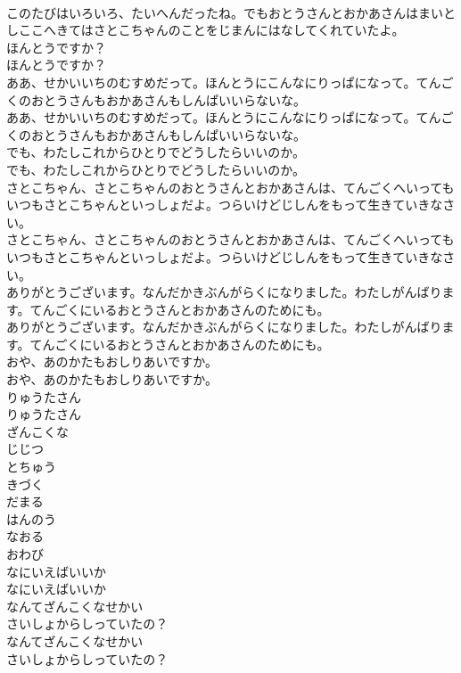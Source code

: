 \documentclass[8pt]{extreport}
\begin{document}
\begin{CJK}{UTF8}{min}
\\	このたびはいろいろ、たいへんだったね。でもおとうさんとおかあさんはまいとしここへきてはさとこちゃんのことをじまんにはなしてくれていたよ。
\\	ほんとうですか？
\\	ほんとうですか？
\\	ああ、せかいいちのむすめだって。ほんとうにこんなにりっぱになって。てんごくのおとうさんもおかあさんもしんぱいいらないな。
\\	ああ、せかいいちのむすめだって。ほんとうにこんなにりっぱになって。てんごくのおとうさんもおかあさんもしんぱいいらないな。
\\	でも、わたしこれからひとりでどうしたらいいのか。
\\	でも、わたしこれからひとりでどうしたらいいのか。
\\	さとこちゃん、さとこちゃんのおとうさんとおかあさんは、てんごくへいってもいつもさとこちゃんといっしょだよ。つらいけどじしんをもって生きていきなさい。
\\	さとこちゃん、さとこちゃんのおとうさんとおかあさんは、てんごくへいってもいつもさとこちゃんといっしょだよ。つらいけどじしんをもって生きていきなさい。
\\	ありがとうございます。なんだかきぶんがらくになりました。わたしがんばります。てんごくにいるおとうさんとおかあさんのためにも。
\\	ありがとうございます。なんだかきぶんがらくになりました。わたしがんばります。てんごくにいるおとうさんとおかあさんのためにも。
\\	おや、あのかたもおしりあいですか。
\\	おや、あのかたもおしりあいですか。
\\	りゅうたさん
\\	りゅうたさん
\\	ざんこくな
\\	じじつ
\\	とちゅう
\\	きづく
\\	だまる
\\	はんのう
\\	なおる
\\	おわび
\\	なにいえばいいか
\\	なにいえばいいか
\\	なんてざんこくなせかい
\\	さいしょからしっていたの？
\\	なんてざんこくなせかい
\\	さいしょからしっていたの？

\end{CJK}
\end{document}
